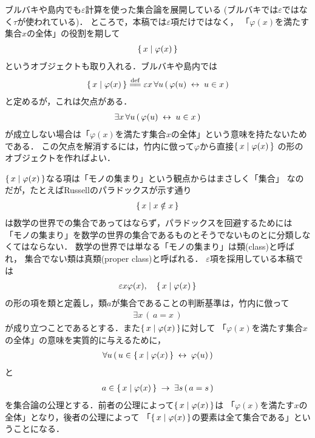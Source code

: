 	ブルバキ\cite{key5}や島内\cite{key6}でも$\varepsilon$計算を使った集合論を展開している
	(ブルバキ\cite{key5}では$\varepsilon$ではなく$\tau$が使われている)．
	ところで，本稿では$\varepsilon$項だけではなく，
	「$\varphi(x)$を満たす集合$x$の全体」の役割を期して
	\begin{align}
		\{\, x \mid \varphi(x)\, \}
	\end{align}
	というオブジェクトも取り入れる．ブルバキ\cite{key5}や島内\cite{key6}では
	\begin{align}
		\Set{x}{\varphi(x)} \defeq \varepsilon x\, \forall u\, 
		(\, \varphi(u) \lrarrow u \in x\, )
	\end{align}
	と定めるが，これは欠点がある．
	\begin{align}
		\exists x\, \forall u\, (\, \varphi(u) \hspace{0.25em}\leftrightarrow\hspace{0.25em} u \in x\, )
	\end{align}
	が成立しない場合は「$\varphi(x)$を満たす集合$x$の全体」という意味を持たないためである．
	この欠点を解消するには，竹内\cite{key4}に倣って$\varphi$から直接$\{\, x \mid \varphi(x)\, \}$
	の形のオブジェクトを作ればよい．
	
	$\{\, x \mid \varphi(x)\, \}$なる項は「モノの集まり」という観点からはまさしく「集合」
	なのだが，たとえばRussellのパラドックスが示す通り
	\begin{align}
		\{\, x \mid x \notin x\, \}
	\end{align}
	は数学の世界での集合であってはならず，パラドックスを回避するためには
	「モノの集まり」を数学の世界の集合であるものとそうでないものとに分類しなくてはならない．
	数学の世界では単なる「モノの集まり」は類(class)と呼ばれ，
	集合でない類は真類(proper class)と呼ばれる．
	$\varepsilon$項を採用している本稿では
	\begin{align}
		\varepsilon x \varphi(x),\quad \{\, x \mid \varphi(x)\, \}
	\end{align}
	の形の項を類と定義し，類$a$が集合であることの判断基準は，竹内\cite{key4}に倣って
	\begin{align}
		\exists x\, (\, a = x\, )
	\end{align}
	が成り立つことであるとする．また$\{\, x \mid \varphi(x)\, \}$に対して
	「$\varphi(x)$を満たす集合$x$の全体」の意味を実質的に与えるために，
	\begin{align}
		\forall u\, (\, u \in \{\, x \mid \varphi(x)\, \} \hspace{0.25em}\leftrightarrow\hspace{0.25em} \varphi(u)\, )
	\end{align}
	と
	\begin{align}
		a \in \{\, x \mid \varphi(x)\, \} \hspace{0.25em}\rightarrow\hspace{0.25em} \exists s\, (\, a = s\, )
	\end{align}
	を集合論の公理とする．前者の公理によって$\{\, x \mid \varphi(x)\, \}$は
	「$\varphi(x)$を満たす$x$の全体」となり，後者の公理によって
	「$\{\, x \mid \varphi(x)\, \}$の要素は全て集合である」ということになる．
	
